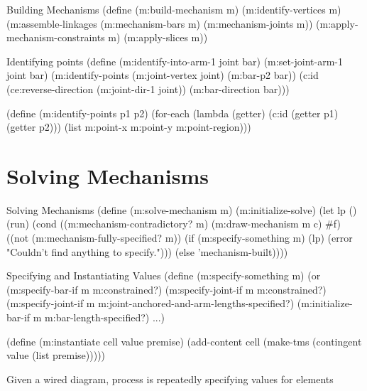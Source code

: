 \begin{code-listing}
{Building Mechanisms}
(define (m:build-mechanism m)
  (m:identify-vertices m)
  (m:assemble-linkages (m:mechanism-bars m)
                       (m:mechanism-joints m))
  (m:apply-mechanism-constraints m)
  (m:apply-slices m))
\end{code-listing}

\begin{code-listing}
[label=identifying-points]
{Identifying points}
(define (m:identify-into-arm-1 joint bar)
  (m:set-joint-arm-1 joint bar)
  (m:identify-points (m:joint-vertex joint)
                     (m:bar-p2 bar))
  (c:id (ce:reverse-direction (m:joint-dir-1 joint))
        (m:bar-direction bar)))

(define (m:identify-points p1 p2)
  (for-each (lambda (getter)
              (c:id (getter p1)
                    (getter p2)))
            (list m:point-x m:point-y m:point-region)))
\end{code-listing}

\section{Solving Mechanisms}

\begin{code-listing}
[label=solve-mechanism]
{Solving Mechanisms}
(define (m:solve-mechanism m)
  (m:initialize-solve)
  (let lp ()
    (run)
    (cond ((m:mechanism-contradictory? m)
           (m:draw-mechanism m c)
           #f)
          ((not (m:mechanism-fully-specified? m))
           (if (m:specify-something m)
               (lp)
               (error "Couldn't find anything to specify.")))
          (else 'mechanism-built))))
\end{code-listing}

\begin{code-listing}
[label=specify-something]
{Specifying and Instantiating Values}
(define (m:specify-something m)
  (or
   (m:specify-bar-if m m:constrained?)
   (m:specify-joint-if m m:constrained?)
   (m:specify-joint-if m m:joint-anchored-and-arm-lengths-specified?)
   (m:initialize-bar-if m m:bar-length-specified?)
   ...)

(define (m:instantiate cell value premise)
  (add-content cell
    (make-tms (contingent value (list premise)))))
\end{code-listing}


Given a wired diagram, process is repeatedly specifying values for elements



